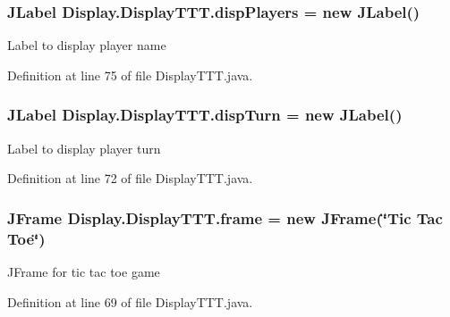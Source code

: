 \subsubsection[{disp\+Players}]{\setlength{\rightskip}{0pt plus 5cm}J\+Label Display.\+Display\+T\+T\+T.\+disp\+Players = new J\+Label()\hspace{0.3cm}{\ttfamily [private]}}\label{class_display_1_1_display_t_t_t_a2f2eeba39f4aa0dcc00ef6b72e2b6c66}
Label to display player name 

Definition at line 75 of file Display\+T\+T\+T.\+java.

\hypertarget{class_display_1_1_display_t_t_t_a22f3ef7e7b2123a2b900bc8511bdd474}{}
\subsubsection[{disp\+Turn}]{\setlength{\rightskip}{0pt plus 5cm}J\+Label Display.\+Display\+T\+T\+T.\+disp\+Turn = new J\+Label()\hspace{0.3cm}{\ttfamily [private]}}\label{class_display_1_1_display_t_t_t_a22f3ef7e7b2123a2b900bc8511bdd474}
Label to display player turn 

Definition at line 72 of file Display\+T\+T\+T.\+java.

\hypertarget{class_display_1_1_display_t_t_t_ab4d0cb92c4459675e8abd22f8ad4161f}{}
\subsubsection[{frame}]{\setlength{\rightskip}{0pt plus 5cm}J\+Frame Display.\+Display\+T\+T\+T.\+frame = new J\+Frame(\char`\"{}Tic Tac Toe\char`\"{})\hspace{0.3cm}{\ttfamily [private]}}\label{class_display_1_1_display_t_t_t_ab4d0cb92c4459675e8abd22f8ad4161f}
J\+Frame for tic tac toe game 

Definition at line 69 of file Display\+T\+T\+T.\+java.

\hypertarget{class_display_1_1_display_t_t_t_a2e4a57cf17355b6a63f5b9d4e9e74de4}{}
